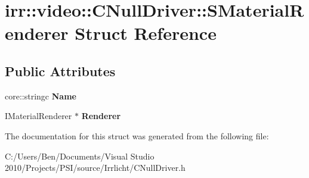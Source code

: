 \hypertarget{structirr_1_1video_1_1_c_null_driver_1_1_s_material_renderer}{\section{irr\-:\-:video\-:\-:C\-Null\-Driver\-:\-:S\-Material\-Renderer Struct Reference}
\label{structirr_1_1video_1_1_c_null_driver_1_1_s_material_renderer}
}
\subsection*{Public Attributes}
\begin{DoxyCompactItemize}
\item 
\hypertarget{structirr_1_1video_1_1_c_null_driver_1_1_s_material_renderer_af1b1e11f157ec4c8a76df1be247a0a82}{core\-::stringc {\bfseries Name}}\label{structirr_1_1video_1_1_c_null_driver_1_1_s_material_renderer_af1b1e11f157ec4c8a76df1be247a0a82}

\item 
\hypertarget{structirr_1_1video_1_1_c_null_driver_1_1_s_material_renderer_a32f5e5e1f41b7c93bf35196772cf711e}{I\-Material\-Renderer $\ast$ {\bfseries Renderer}}\label{structirr_1_1video_1_1_c_null_driver_1_1_s_material_renderer_a32f5e5e1f41b7c93bf35196772cf711e}

\end{DoxyCompactItemize}


The documentation for this struct was generated from the following file\-:\begin{DoxyCompactItemize}
\item 
C\-:/\-Users/\-Ben/\-Documents/\-Visual Studio 2010/\-Projects/\-P\-S\-I/source/\-Irrlicht/C\-Null\-Driver.\-h\end{DoxyCompactItemize}
